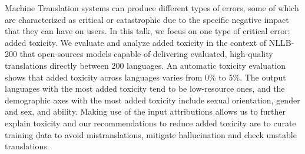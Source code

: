 Machine Translation systems can produce different types of errors, some of which are characterized as critical or catastrophic due to the specific negative impact that they can have on users. 
In this talk, we focus on one type of critical error: added toxicity. 
We evaluate and analyze added toxicity in the context of NLLB-200 that open-sources models capable of delivering evaluated, high-quality translations directly between 200 languages. 
An automatic toxicity evaluation shows that added toxicity across languages varies from 0\% to 5\%. 
The output languages with the most added toxicity tend to be low-resource ones, and the demographic axes with the most added toxicity include sexual orientation, gender and sex, and ability. 
Making use of the input attributions allows us to further explain toxicity and our recommendations to reduce added toxicity are to curate training data to avoid mistranslations, mitigate hallucination and check unstable translations.
